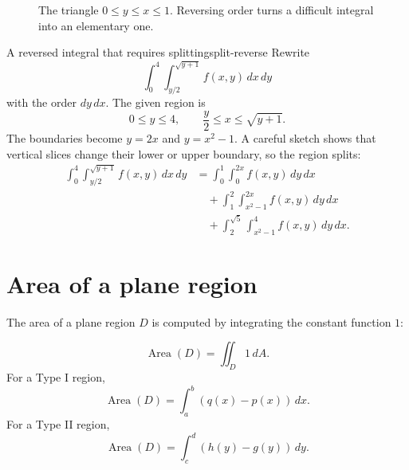\documentclass[11pt]{article}
\newcommand{\Area}{\operatorname{Area}}
\begin{document}
\begin{figure}[H]
\centering
{}
\caption{The triangle $0\le y\le x\le 1$. Reversing order turns a difficult integral into an elementary one.}
\end{figure}

\begin{examplebox}{A reversed integral that requires splitting}{split-reverse}
Rewrite
\[
\int_0^4\int_{y/2}^{\sqrt{y+1}} f(x,y)\,dx\,dy
\]
with the order $dy\,dx$.
The given region is
\[
0\le y\le 4,\qquad \frac{y}{2}\le x\le \sqrt{y+1}.
\]
The boundaries become $y=2x$ and $y=x^2-1$. A careful sketch shows that vertical slices change their lower or upper boundary, so the region splits:
\[
\begin{aligned}
\int_0^4\int_{y/2}^{\sqrt{y+1}} f(x,y)\,dx\,dy
&=\int_0^1\int_0^{2x} f(x,y)\,dy\,dx \\
&\quad+\int_1^2\int_{x^2-1}^{2x} f(x,y)\,dy\,dx \\
&\quad+\int_2^{\sqrt5}\int_{x^2-1}^{4} f(x,y)\,dy\,dx.
\end{aligned}
\]
\end{examplebox}

\section{Area of a plane region}

The area of a plane region $D$ is computed by integrating the constant function $1$:
\begin{importantbox}
\[
\Area(D)=\iint_D 1\,dA.
\]
For a Type I region,
\[
\Area(D)=\int_a^b(q(x)-p(x))\,dx.
\]
For a Type II region,
\[
\Area(D)=\int_c^d(h(y)-g(y))\,dy.
\]
\end{importantbox}
\end{document}
